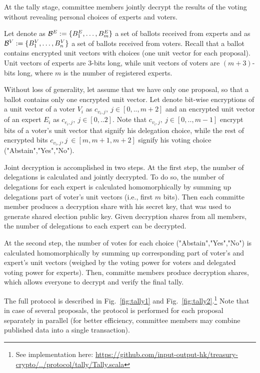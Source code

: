 At the tally stage, committee members jointly decrypt the results of the voting without revealing personal choices of experts and voters. 

Let denote as $\mathcal{B}^E:=\{B^E_1,\ldots, B^E_m \}$ a set of ballots received from experts and as $\mathcal{B}^V:=\{B^V_1,\ldots, B^V_n \}$ a set of ballots received from voters. Recall that a ballot contains encrypted unit vectors with choices (one unit vector for each proposal). Unit vectors of experts are $3$-bits long, while unit vectors of voters are $(m+3)$-bits long, where $m$ is the number of registered experts.

Without loss of generality, let assume that we have only one proposal, so that a ballot contains only one encrypted unit vector. Let denote bit-wise encryptions of a unit vector of a voter $V_i$ as $c_{v_i,j},\ j\in [0,..,m+2]$ and an encrypted unit vector of an expert $E_i$ as $c_{e_i,j},\ j\in [0,..2]$. Note that $c_{v_i,j},\ j\in [0,..,m-1]$ encrypt bits of a voter's unit vector that signify his delegation choice, while the rest of encrypted bits $c_{v_i,j},j\ \in [m,m+1,m+2]$ signify his voting choice ("Abstain","Yes","No").

Joint decryption is accomplished in two steps. At the first step, the number of delegations is calculated and jointly decrypted. To do so, the number of delegations for each expert is calculated homomorphically by summing up delegations part of voter's unit vectors (i.e., first $m$ bits). Then each committe member produces a decryption share with his secret key, that was used to generate shared election public key. Given decryption shares from all members, the number of delegations to each expert can be decrypted.

At the second step, the number of votes for each choice ("Abstain","Yes","No") is calculated homomorphically by summing up corresponding part of voter's and expert's unit vectors (weighed by the voting power for voters and delegated voting power for experts). Then, committe members produce decryption shares, which allows everyone to decrypt and verify the final tally.

The full protocol is described in Fig.~\ref{fig:tally1} and Fig.~\ref{fig:tally2}.\footnote{See implementation here: \href{https://github.com/input-output-hk/treasury-crypto/blob/new_api/src/main/scala/io/iohk/protocol/tally/Tally.scala}{https://github.com/input-output-hk/treasury-crypto/../protocol/tally/Tally.scala}} Note that in case of several proposals, the protocol is performed for each proposal separately in parallel (for better efficiency, committee members may combine published data into a single transaction).

